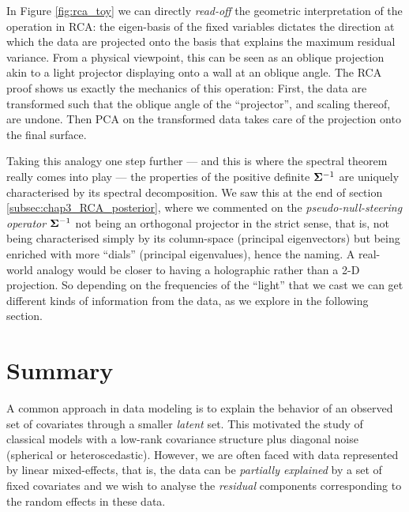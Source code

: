       In Figure \ref{fig:rca_toy} we can directly \textit{read-off} the geometric interpretation of the operation in RCA: the eigen-basis of the fixed variables dictates the direction at which the data are projected onto the basis that explains the maximum residual variance. From a physical viewpoint, this can be seen as an oblique projection akin to a light projector displaying onto a wall at an oblique angle. The RCA proof shows us exactly the mechanics of this operation: First, the data are transformed such that the oblique angle of the ``projector'', and scaling thereof, are undone. Then PCA on the transformed data takes care of the projection onto the final surface.

      Taking this analogy one step further --- and this is where the spectral theorem really comes into play --- the properties of the positive definite $\mathbf{\Sigma}^{-1}$ are uniquely characterised by its spectral decomposition. We saw this at the end of section \ref{subsec:chap3_RCA_posterior}, where we commented on the \textit{pseudo-null-steering operator} $\mathbf{\Sigma}^{-1}$ not being an orthogonal projector in the strict sense, that is, not being characterised simply by its column-space (principal eigenvectors) but being enriched with more ``dials'' (principal eigenvalues), hence the naming. A real-world analogy would be closer to having a holographic rather than a 2-D projection. So depending on the frequencies of the ``light'' that we cast we can get different kinds of information from the data, as we explore in the following section.





  \section{Summary}
  
  
    A common approach in data modeling is to explain the behavior of an observed set of covariates through a smaller \emph{latent} set.
    This motivated the study of classical models with a low-rank covariance structure plus diagonal noise (spherical or heteroscedastic).
    However, we are often faced with data represented by linear mixed-effects, that is, the data can be \emph{partially explained} by a set of fixed covariates and we wish to analyse the \emph{residual} components corresponding to the random effects in these data.
    
